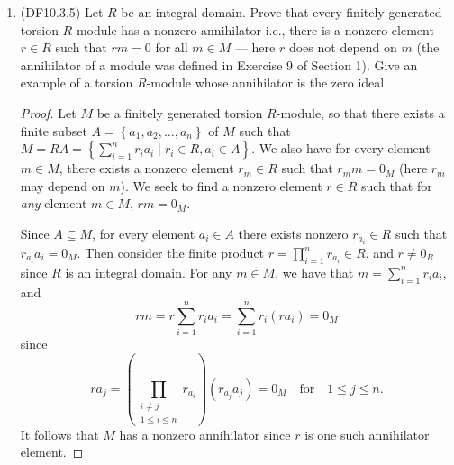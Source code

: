 \documentclass[11pt]{article}
\newcommand{\br}[1]{\left(#1\right)}
\newcommand{\cbr}[1]{\left\{#1\right\}}
\begin{document}
\begin{enumerate}
\begin{proof}
      Since $I$ was a nilpotent ideal, it follows that there exists some $N\in \mathbb{Z}^+$ such that $I^N = \cbr{0_R}$. We also want to establish the containment \[A = I^j[\varphi(M) + IN] \subseteq I^j\varphi(M) + I^{j+1}N = B\] by double inclusion. Observe that any element of $A$ is a finite sum $\sum_i a_{ij}[\varphi(m) + \sum_k a_kn_k] =\sum_i [a_{ij}\varphi(m) + \sum_k a_{ij}a_kn_k]$ for $a_{ij}\in I^j$. Since $a_{ij}a_k\in I^{j+1}$ the containment $A\subseteq B$ holds.

      Furthermore also observe that for any $k$, $I^k\varphi(M)\subseteq \varphi(M)$ since $\varphi(M)$ is a module (a submodule of $N$). 
      
      By repeatedly applying the equality $N = \varphi(M) + IN$ to itself $N$ times and using the previous facts we obtain \[N \subseteq \varphi(M) + I\varphi(M) + \cdots + I^{N-1}\varphi(M) + I^N N \subseteq \varphi(M).\] Since $\varphi(M)\subseteq N$, it follows that $\varphi(M) = N$; that is, $\varphi$ is surjective.
    \end{proof}
    \item (DF10.3.5) Let $R$ be an integral domain. Prove that every finitely generated torsion $R$-module has a nonzero annihilator i.e., there is a nonzero element $r\in R$ such that $rm = 0$ for all $m\in M$ --- here $r$ does not depend on $m$ (the annihilator of a module was defined in Exercise 9 of Section 1). Give an example of a torsion $R$-module whose annihilator is the zero ideal. \begin{proof}
      Let $M$ be a finitely generated torsion $R$-module, so that there exists a finite subset $A = \cbr{a_1,a_2,\dots,a_n}$ of $M$ such that $M = RA = \cbr{\sum_{i=1}^nr_ia_i\mid r_i\in R, a_i\in A}$. We also have for every element $m\in M$, there exists a nonzero element $r_m\in R$ such that $r_mm = 0_M$ (here $r_m$ may depend on $m$). We seek to find a nonzero element $r\in R$ such that for \textit{any} element $m\in M$, $rm = 0_M$. 

      Since $A\subseteq M$, for every element $a_i\in A$ there exists nonzero $r_{a_i}\in R$ such that $r_{a_i}a_i = 0_M$. Then consider the finite product $r = \prod_{i=1}^n r_{a_i} \in R$, and $r\neq 0_R$ since $R$ is an integral domain. For any $m\in M$, we have that $m = \sum_{i=1}^nr_ia_i$, and \[rm = r\sum_{i=1}^nr_ia_i = \sum_{i=1}^nr_i(ra_i) = 0_M\] since \[ra_j = \br{\prod_{\substack{i\neq j \\ 1\leq i \leq n}} r_{a_i}}(r_{a_j}a_j) = 0_M\quad \text{for}\quad 1\leq j\leq n.\] It follows that $M$ has a nonzero annihilator since $r$ is one such annihilator element.
    \end{proof}


\end{enumerate}
\end{document}

